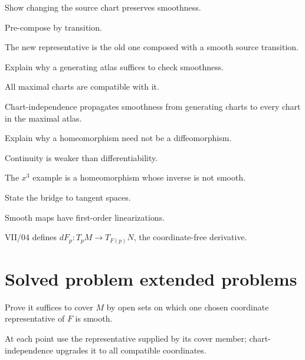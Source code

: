 \begin{exercise}\label{exr:vii03-21}
Show changing the source chart preserves smoothness.
\end{exercise}
\begin{hint}
Pre-compose by transition.
\end{hint}
\begin{solution}
The new representative is the old one composed with a smooth source transition.
\end{solution}

\begin{exercise}\label{exr:vii03-22}
Explain why a generating atlas suffices to check smoothness.
\end{exercise}
\begin{hint}
All maximal charts are compatible with it.
\end{hint}
\begin{solution}
Chart-independence propagates smoothness from generating charts to every chart in the maximal atlas.
\end{solution}

\begin{exercise}\label{exr:vii03-23}
Explain why a homeomorphism need not be a diffeomorphism.
\end{exercise}
\begin{hint}
Continuity is weaker than differentiability.
\end{hint}
\begin{solution}
The \(x^3\) example is a homeomorphism whose inverse is not smooth.
\end{solution}

\begin{exercise}\label{exr:vii03-24}
State the bridge to tangent spaces.
\end{exercise}
\begin{hint}
Smooth maps have first-order linearizations.
\end{hint}
\begin{solution}
VII/04 defines \(dF_p:T_pM\to T_{F(p)}N\), the coordinate-free derivative.
\end{solution}

\section{Solved problem extended problems}
\begin{problem}\label{prob:vii03-01}
Prove it suffices to cover \(M\) by open sets on which one chosen coordinate representative of \(F\) is smooth.
\end{problem}
\begin{solution}
At each point use the representative supplied by its cover member; chart-independence upgrades it to all compatible coordinates.
\end{solution}

